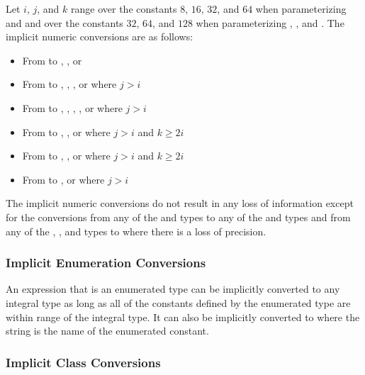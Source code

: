Let $i$, $j$, and $k$ range over the constants $8$, $16$, $32$, and
$64$ when parameterizing  and  and over the
constants $32$, $64$, and $128$ when
parameterizing , , and .  The
implicit numeric conversions are as follows:
\begin{itemize}
\item From  to , , or 
\item From  to , , , or  where $j > i$
\item From  to , , , , or  where $j > i$
\item From  to , , or  where $j > i$ and $k \geq 2i$
\item From  to , , or  where $j > i$ and $k \geq 2i$
\item From  to , or  where $j > i$
\end{itemize}

The implicit numeric conversions do not result in any loss of
information except for the conversions from any of the 
and  types to any of the  and 
types and from any of the , , and 
types to  where there is a loss of precision.

\subsubsection{Implicit Enumeration Conversions}
\label{Implicit_Enumeration_Conversions}

An expression that is an enumerated type can be implicitly converted
to any integral type as long as all of the constants defined by the
enumerated type are within range of the integral type.  It can also be
implicitly converted to  where the string is the name of
the enumerated constant.

\subsubsection{Implicit Class Conversions}
\label{Implicit_Class_Conversions}

